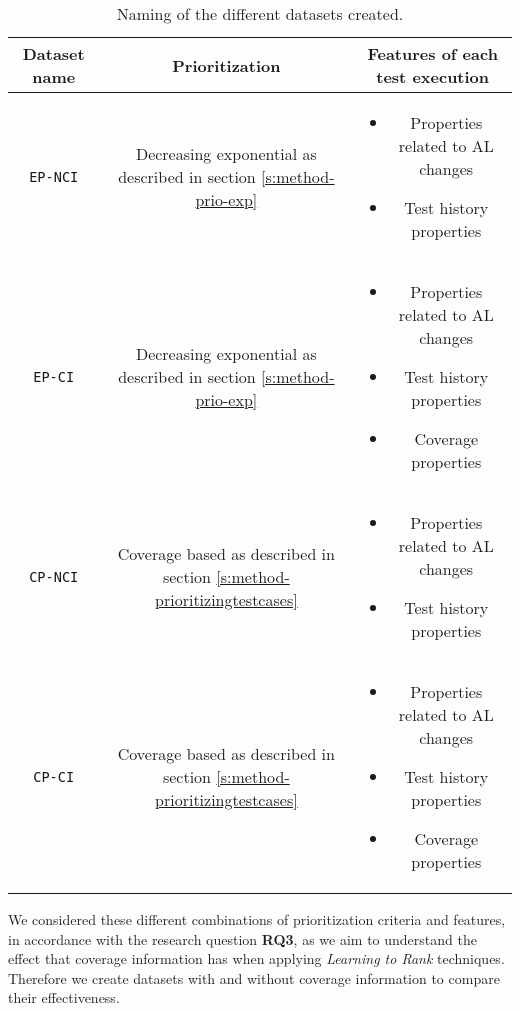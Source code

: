 \begin{table}[h!]
    \centering
    {\renewcommand{\arraystretch}{2.5}
    \begin{tabular}{|c|c|c|}
        \hline
        \textbf{Dataset name} & \textbf{Prioritization} & \textbf{Features of each test execution} \\
        \hline
        \parbox{0.12\textwidth}{\texttt{EP-NCI}} & \parbox{0.30\textwidth}{Decreasing exponential as described in section \ref{s:method-prio-exp}} & \parbox{0.40\textwidth}{
            \begin{itemize}
                \item Properties related to AL changes
                \item Test history properties
            \end{itemize}
        } \\
        \hline
        \parbox{0.12\textwidth}{\texttt{EP-CI}} & \parbox{0.30\textwidth}{Decreasing exponential as described in section \ref{s:method-prio-exp}} & \parbox{0.40\textwidth}{
            \begin{itemize}
                \item Properties related to AL changes
                \item Test history properties
                \item Coverage properties
            \end{itemize}
        } \\
        \hline
        \parbox{0.12\textwidth}{\texttt{CP-NCI}} & \parbox{0.30\textwidth}{Coverage based as described in section \ref{s:method-prioritizingtestcases}} & \parbox{0.40\textwidth}{
            \begin{itemize}
                \item Properties related to AL changes
                \item Test history properties
            \end{itemize}
        } \\
        \hline
        \parbox{0.12\textwidth}{\texttt{CP-CI}} & \parbox{0.30\textwidth}{Coverage based as described in section \ref{s:method-prioritizingtestcases}} & \parbox{0.40\textwidth}{
            \begin{itemize}
                \item Properties related to AL changes
                \item Test history properties
                \item Coverage properties
            \end{itemize}
        } \\
        \hline
    \end{tabular} }
    \caption{Naming of the different datasets created.}
    \label{f:table-naming-datasets}
\end{table}

We considered these different combinations of prioritization criteria and features, in accordance with
the research question \textbf{RQ3}, as we aim to understand the effect that coverage information has 
when applying \emph{Learning to Rank} techniques. Therefore we create datasets with and without coverage
information to compare their effectiveness.
